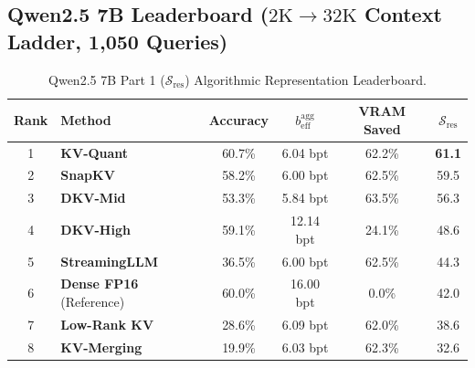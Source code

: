 \documentclass[10pt]{article}
\theoremstyle{definition}
\begin{document}
\clearpage
\subsection{Qwen2.5 7B Leaderboard (\texorpdfstring{$2\text{K} \to 32\text{K}$}{2K to 32K} Context Ladder, 1,050 Queries)}

\begin{table}[h]
\vspace{6pt}
\centering
\small
\caption{Qwen2.5 7B Part 1 ($\mathcal{S}_{\text{res}}$) Algorithmic Representation Leaderboard.}
\label{tab:q7b_sres}
\begin{tabular}{clcccc}
\toprule
\textbf{Rank} & \textbf{Method} & \textbf{Accuracy} & $b_{\text{eff}}^{\text{agg}}$ & \textbf{VRAM Saved} & $\mathcal{S}_{\text{res}}$ \\
\midrule
1 & \textbf{KV-Quant} & 60.7\% & 6.04 bpt & 62.2\% & \textbf{61.1} \\
2 & \textbf{SnapKV} & 58.2\% & 6.00 bpt & 62.5\% & 59.5 \\
3 & \textbf{DKV-Mid} & 53.3\% & 5.84 bpt & 63.5\% & 56.3 \\
4 & \textbf{DKV-High} & 59.1\% & 12.14 bpt & 24.1\% & 48.6 \\
5 & \textbf{StreamingLLM} & 36.5\% & 6.00 bpt & 62.5\% & 44.3 \\
6 & \textbf{Dense FP16} (Reference) & 60.0\% & 16.00 bpt & 0.0\% & 42.0 \\
7 & \textbf{Low-Rank KV} & 28.6\% & 6.09 bpt & 62.0\% & 38.6 \\
8 & \textbf{KV-Merging} & 19.9\% & 6.03 bpt & 62.3\% & 32.6 \\
\bottomrule
\end{tabular}
\end{table}
\end{document}
